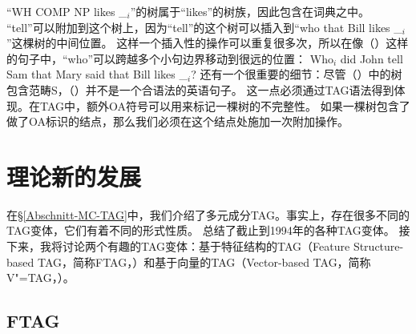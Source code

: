 ``{WH COMP NP likes \_$_i$}''的树属于``{likes}''的树族，因此包含在词典之中。
``{tell}''可以附加到这个树上，因为``{tell}''的这个树可以插入到``{who that Bill likes \_$_i$}''这棵树的中间位置。
这样一个插入性的操作可以重复很多次，所以在像（）这样的句子中，``{who}''可以跨越多个小句边界移动到很远的位置：
\ea 
Who$_i$ did John tell Sam that Mary said that Bill likes \_$_i$?
\z
%
还有一个很重要的细节：尽管（）中的树包含范畴S，（）并不是一个合语法的英语句子。
\z
这一点必须通过TAG语法得到体现。在TAG中，额外OA符号可以用来标记一棵树的不完整性。
如果一棵树包含了做了OA标识的结点，那么我们必须在这个结点处施加一次附加操作。

\section{理论新的发展}

在\S \ref{Abschnitt-MC-TAG}中，我们介绍了多元成分TAG。事实上，存在很多不同的TAG变体，它们有着不同的形式性质。
\citet[\page]{Rambow94a}总结了截止到1994年的各种TAG变体。
接下来，我将讨论两个有趣的TAG变体：基于特征结构的TAG（Feature Structure-based TAG，简称FTAG\indexftag ，\citealp{VSJ88a}）和基于向量的TAG（Vector-based TAG，简称V"=TAG，\citealp{Rambow94a}）。

\subsection{FTAG}

